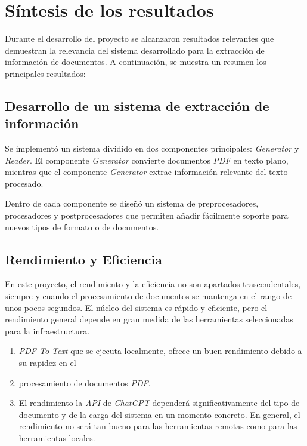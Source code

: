 \section{Síntesis de los resultados}

Durante el desarrollo del proyecto se alcanzaron resultados relevantes que demuestran la relevancia del sistema
desarrollado para la extracción de información de documentos.
A continuación, se muestra un resumen los principales resultados:

\subsection*{Desarrollo de un sistema de extracción de información}

Se implementó un sistema dividido en dos componentes principales: \textit{Generator} y \textit{Reader}.
El componente \textit{Generator} convierte documentos \textit{PDF} en texto plano, mientras que el componente
\textit{Generator} extrae información relevante del texto procesado.

Dentro de cada componente se diseñó un sistema de preprocesadores, procesadores y postprocesadores que permiten
añadir fácilmente soporte para nuevos tipos de formato o de documentos.

\subsection*{Rendimiento y Eficiencia}

En este proyecto, el rendimiento y la eficiencia no son apartados trascendentales, siempre y cuando el procesamiento de
documentos se mantenga en el rango de unos pocos segundos.
El núcleo del sistema es rápido y eficiente, pero el rendimiento general depende en gran medida de las herramientas
seleccionadas para la infraestructura.

\begin{enumerate}
    \item \textit{PDF To Text} que se ejecuta localmente, ofrece un buen rendimiento debido a su rapidez en el
    \item procesamiento de documentos \textit{PDF}.
    \item El rendimiento la \textit{API} de \textit{ChatGPT} dependerá significativamente del tipo de documento y de la
    carga del sistema en un momento concreto.
    En general, el rendimiento no será tan bueno para las herramientas remotas como para las herramientas locales.
\end{enumerate}


